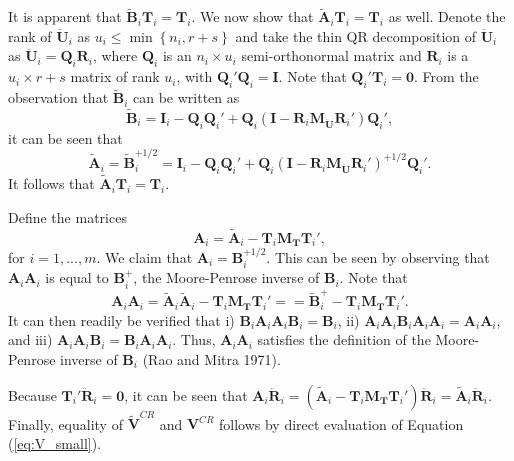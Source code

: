 \documentclass[12pt]{article}
\begin{document}
It is apparent that
\(\tilde{\mathbf{B}}_i \mathbf{T}_i = \mathbf{T}_i\). We now show that
\(\tilde{\mathbf{A}}_i \mathbf{T}_i = \mathbf{T}_i\) as well. Denote the
rank of \(\mathbf{\ddot{U}}_i\) as
\(u_i \leq \min \left\{n_i, r + s \right\}\) and take the thin QR
decomposition of \(\mathbf{\ddot{U}}_i\) as
\(\mathbf{\ddot{U}}_i = \mathbf{Q}_i \mathbf{R}_i\), where
\(\mathbf{Q}_i\) is an \(n_i \times u_i\) semi-orthonormal matrix and
\(\mathbf{R}_i\) is a \(u_i \times r + s\) matrix of rank \(u_i\), with
\(\mathbf{Q}_i'\mathbf{Q}_i = \mathbf{I}\). Note that
\(\mathbf{Q}_i'\mathbf{T}_i = \mathbf{0}\). From the observation that
\(\tilde{\mathbf{B}}_i\) can be written as \[
\tilde{\mathbf{B}}_i = \mathbf{I}_i - \mathbf{Q}_i \mathbf{Q}_i' + \mathbf{Q}_i \left(\mathbf{I} - \mathbf{R}_i \mathbf{M}_{\mathbf{\ddot{U}}} \mathbf{R}_i'\right)\mathbf{Q}_i',
\] it can be seen that \begin{equation}
\tilde{\mathbf{A}}_i = \tilde{\mathbf{B}}_i^{+1/2} = \mathbf{I}_i - \mathbf{Q}_i \mathbf{Q}_i' + \mathbf{Q}_i \left(\mathbf{I} - \mathbf{R}_i \mathbf{M}_{\mathbf{\ddot{U}}} \mathbf{R}_i'\right)^{+1/2} \mathbf{Q}_i'.
\end{equation} It follows that
\(\tilde{\mathbf{A}}_i \mathbf{T}_i = \mathbf{T}_i\).

Define the matrices \begin{equation}
\mathbf{A}_i = \tilde{\mathbf{A}}_i - \mathbf{T}_i \mathbf{M_T}\mathbf{T}_i',
\end{equation} for \(i = 1,...,m\). We claim that
\(\mathbf{A}_i = \mathbf{B}_i^{+1/2}\). This can be seen by observing
that \(\mathbf{A}_i \mathbf{A}_i\) is equal to \(\mathbf{B}_i^+\), the
Moore-Penrose inverse of \(\mathbf{B}_i\). Note that \begin{equation}
\mathbf{A}_i \mathbf{A}_i = \tilde{\mathbf{A}}_i \tilde{\mathbf{A}}_i - \mathbf{T}_i \mathbf{M_T}\mathbf{T}_i' =  = \tilde{\mathbf{B}}_i^+ - \mathbf{T}_i \mathbf{M_T}\mathbf{T}_i'.
\end{equation} It can then readily be verified that i)
\(\mathbf{B}_i \mathbf{A}_i \mathbf{A}_i \mathbf{B}_i = \mathbf{B}_i\),
ii)
\(\mathbf{A}_i \mathbf{A}_i \mathbf{B}_i \mathbf{A}_i \mathbf{A}_i = \mathbf{A}_i \mathbf{A}_i\),
and iii)
\(\mathbf{A}_i \mathbf{A}_i \mathbf{B}_i = \mathbf{B}_i \mathbf{A}_i \mathbf{A}_i\).
Thus, \(\mathbf{A}_i\mathbf{A}_i\) satisfies the definition of the
Moore-Penrose inverse of \(\mathbf{B}_i\) (Rao and Mitra 1971).

Because \(\mathbf{T}_i ' \mathbf{\ddot{R}}_i= \mathbf{0}\), it can be
seen that
\(\mathbf{A}_i \mathbf{\ddot{R}}_i = \left(\tilde{\mathbf{A}}_i - \mathbf{T}_i \mathbf{M_T}\mathbf{T}_i'\right)\mathbf{\ddot{R}}_i = \tilde{\mathbf{A}}_i \mathbf{\ddot{R}}_i\).
Finally, equality of \(\mathbf{\tilde{V}}^{CR}\) and \(\mathbf{V}^{CR}\)
follows by direct evaluation of Equation (\ref{eq:V_small}).
\end{document}
